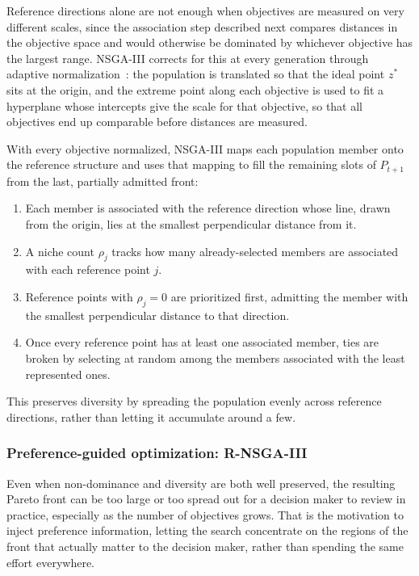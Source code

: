 Reference directions alone are not enough when objectives are measured on very different scales, since the association step described next compares distances in the objective space and would otherwise be dominated by whichever objective has the largest range. NSGA-III corrects for this at every generation through adaptive normalization~\cite{nsga-iii-pt1}: the population is translated so that the ideal point $z^\ast$ sits at the origin, and the extreme point along each objective is used to fit a hyperplane whose intercepts give the scale for that objective, so that all objectives end up comparable before distances are measured.

With every objective normalized, NSGA-III maps each population member onto the reference structure and uses that mapping to fill the remaining slots of $P_{t+1}$ from the last, partially admitted front:
\begin{enumerate}
    \item Each member is associated with the reference direction whose line, drawn from the origin, lies at the smallest perpendicular distance from it.
    \item A niche count $\rho_j$ tracks how many already-selected members are associated with each reference point $j$.
    \item Reference points with $\rho_j=0$ are prioritized first, admitting the member with the smallest perpendicular distance to that direction.
    \item Once every reference point has at least one associated member, ties are broken by selecting at random among the members associated with the least represented ones.
\end{enumerate}
This preserves diversity by spreading the population evenly across reference directions, rather than letting it accumulate around a few.




\subsubsection{Preference-guided optimization: R-NSGA-III}
\label{sec:sota-rnsga3}

Even when non-dominance and diversity are both well preserved, the resulting Pareto front can be too large or too spread out for a decision maker to review in practice, especially as the number of objectives grows. That is the motivation to inject preference information, letting the search concentrate on the regions of the front that actually matter to the decision maker, rather than spending the same effort everywhere. 

